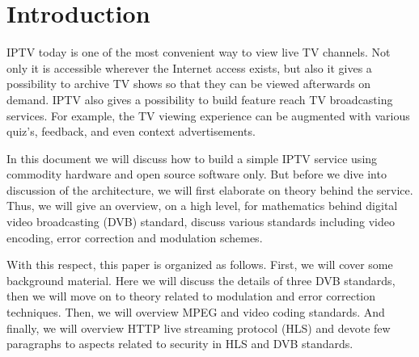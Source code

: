 \section{Introduction}
\label{section:introduction}

IPTV today is one of the most convenient way to view live TV channels.
Not only it is accessible wherever the Internet access exists, but 
also it gives a possibility to archive TV shows so that they can be 
viewed afterwards on demand. IPTV also gives a possibility to build
feature reach TV broadcasting services. For example, the TV viewing 
experience can be augmented with various quiz's, feedback, and even
context advertisements. 

In this document we will discuss how to build a simple IPTV service
using commodity hardware and open source software only. But before we dive into discussion
of the architecture, we will first elaborate on theory behind the 
service. Thus, we will give an overview, on a high level, for mathematics 
behind digital video broadcasting (DVB) standard, discuss various
standards including video encoding, error correction and modulation
schemes. 

With this respect, this paper is organized as follows. First, we 
will cover some background material. Here we will discuss the 
details of three DVB standards, then we will move on to theory
related to modulation and error correction techniques. Then,
we will overview MPEG and video coding standards. And finally, 
we will overview HTTP live streaming protocol (HLS) and devote 
few paragraphs to aspects related to security in HLS and DVB 
standards.